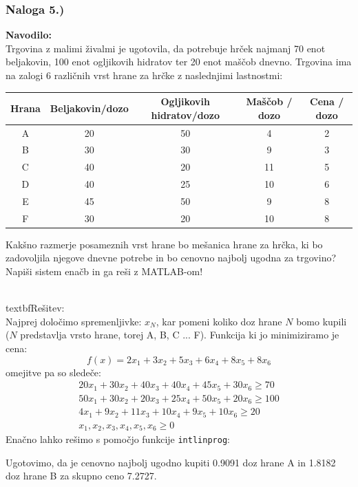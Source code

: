 \documentclass[a4paper,11pt]{article}
\begin{document}
\subsubsection{Naloga 5.)}
\label{task:junij2008_5}

\textbf{Navodilo:} \\
Trgovina z malimi živalmi je ugotovila, da potrebuje hrček najmanj 70 enot beljakovin, 100 enot ogljikovih hidratov ter 20 enot maščob dnevno. Trgovina ima na zalogi 6 različnih vrst hrane za hrčke z naslednjimi lastnostmi:
\begin{table}[h]
	\centering
	\begin{tabular}{| c | c | c | c | c |}
		\hline
		Hrana & Beljakovin/dozo & Ogljikovih hidratov/dozo & Maščob / dozo & Cena / dozo \\ \hline
		A & 20 & 50 & 4 & 2 \\ \hline
		B & 30 & 30 & 9 & 3 \\ \hline
		C & 40 & 20 & 11 & 5 \\ \hline
		D & 40 & 25 & 10 & 6 \\ \hline
		E & 45  & 50 & 9 & 8 \\ \hline
		F & 30 & 20 & 10 & 8 \\ \hline
	\end{tabular}
\end{table}
Kakšno razmerje posameznih vrst hrane bo mešanica hrane za hrčka, ki bo zadovoljila njegove dnevne potrebe in bo cenovno najbolj ugodna za trgovino? Napiši sistem enačb in ga reši z MATLAB-om!

\vspace{5mm}
\noindent \\textbf{Rešitev:} \\
Najprej določimo spremenljivke: $x_N$, kar pomeni koliko doz hrane $N$ bomo kupili ($N$ predstavlja vrsto hrane, torej A, B, C ... F). Funkcija ki jo minimiziramo je cena:
\begin{equation} \label{eq:junij2008_5}
f(x) = 2x_1 + 3x_2 + 5x_3 + 6x_4 + 8x_5 + 8x_6
\end{equation}
omejitve pa so sledeče:
\begin{equation}
	\begin{gathered}
		20x_1 + 30x_2 + 40x_3 + 40x_4 + 45x_5 + 30x_6 \geq 70 \\
		50x_1 + 30x_2 + 20x_3 + 25x_4 + 50x_5 + 20x_6 \geq 100 \\
		4x_1 + 9x_2 + 11x_3 + 10x_4 + 9x_5 +  10x_6 \geq 20 \\
		x_1, x_2, x_3, x_4, x_5, x_6  \geq 0
	\end{gathered}
\end{equation}
Enačno lahko rešimo s pomočjo funkcije  \texttt{intlinprog}:

Ugotovimo, da je cenovno najbolj ugodno kupiti 0.9091 doz hrane A in 1.8182 doz hrane B za skupno ceno 7.2727.
\end{document}
